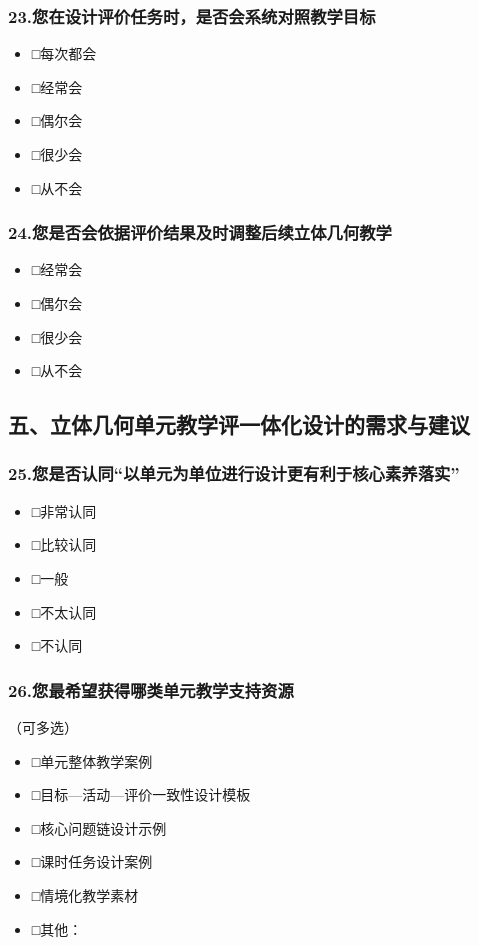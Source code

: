 \documentclass[UTF8,a4paper,12pt,twoside]{ctexart}
\begin{document}
\subsubsection*{23.您在设计评价任务时，是否会系统对照教学目标}
\begin{itemize}
\item □每次都会
\item □经常会
\item □偶尔会
\item □很少会
\item □从不会
\end{itemize}

\subsubsection*{24.您是否会依据评价结果及时调整后续立体几何教学}
\begin{itemize}
\item □经常会
\item □偶尔会
\item □很少会
\item □从不会
\end{itemize}

\subsection*{五、立体几何单元教学评一体化设计的需求与建议}

\subsubsection*{25.您是否认同“以单元为单位进行设计更有利于核心素养落实”}
\begin{itemize}
\item □非常认同
\item □比较认同
\item □一般
\item □不太认同
\item □不认同
\end{itemize}

\subsubsection*{26.您最希望获得哪类单元教学支持资源}
（可多选）
\begin{itemize}
\item □单元整体教学案例
\item □目标—活动—评价一致性设计模板
\item □核心问题链设计示例
\item □课时任务设计案例
\item □情境化教学素材
\item □其他：\underline{\hspace{2cm}}
\end{itemize}
\end{document}
